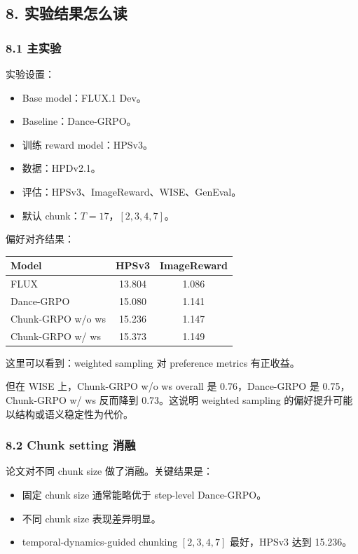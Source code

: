 \subsection{8. 实验结果怎么读}

\subsubsection{8.1 主实验}

实验设置：

\begin{itemize}[leftmargin=1.5em]
  \item Base model：FLUX.1 Dev。
  \item Baseline：Dance-GRPO。
  \item 训练 reward model：HPSv3。
  \item 数据：HPDv2.1。
  \item 评估：HPSv3、ImageReward、WISE、GenEval。
  \item 默认 chunk：\(T=17\)，\([2,3,4,7]\)。
\end{itemize}

偏好对齐结果：

\begin{center}
\begin{tabular}{lcc}
\toprule
\textbf{Model} & \textbf{HPSv3} & \textbf{ImageReward} \\
\midrule
FLUX & 13.804 & 1.086 \\
Dance-GRPO & 15.080 & 1.141 \\
Chunk-GRPO w/o ws & 15.236 & 1.147 \\
Chunk-GRPO w/ ws & 15.373 & 1.149 \\
\bottomrule
\end{tabular}
\end{center}

这里可以看到：weighted sampling 对 preference metrics 有正收益。

但在 WISE 上，Chunk-GRPO w/o ws overall 是 0.76，Dance-GRPO 是 0.75，Chunk-GRPO w/ ws 反而降到 0.73。这说明 weighted sampling 的偏好提升可能以结构或语义稳定性为代价。

\subsubsection{8.2 Chunk setting 消融}

论文对不同 chunk size 做了消融。关键结果是：

\begin{itemize}[leftmargin=1.5em]
  \item 固定 chunk size 通常能略优于 step-level Dance-GRPO。
  \item 不同 chunk size 表现差异明显。
  \item temporal-dynamics-guided chunking \([2,3,4,7]\) 最好，HPSv3 达到 15.236。
\end{itemize}

